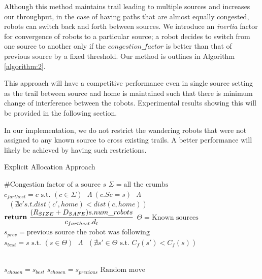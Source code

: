 \documentclass[letterpaper, 10 pt, conference]{ieeeconf}  %
\begin{document}
Although this method maintains trail leading to multiple sources and increases our throughput, in the case of having paths that are almost equally congested, robots can switch back and forth between sources. We introduce an \emph{inertia} factor for convergence of robots to a particular source; a robot decides to switch from one source to another only if the $congestion\_factor$ is better than that of previous source by a fixed threshold. Our method is outlines in Algorithm \ref{algorithm:2}.

This approach will have a competitive performance even in single source setting as the trail between source and home is maintained such that there is minimum change of interference between the robots. Experimental results showing this will be provided in the following section. 

In our implementation, we do not restrict the wandering robots that were not assigned to any known source to cross existing trails. A better performance will likely be achieved by having such restrictions.

\begin{algorithm}
\caption{Explicit Allocation Approach}\label{algorithm:2}
\begin{algorithmic}
\State $\text{\# Congestion factor of a source } s$
  \State $\Sigma = \text{all the crumbs}$
  \State $c_{farthest} =  c \text{ s.t. } (c \in \Sigma) \text{ } \Lambda \ (c.Sc=s) \text{ } \Lambda$
  \State  $\text{                                                 }(\nexists c' { s.t. } dist(c', home) < dist(c, home))$
  \\
  \State $\bold{return} \text{ } \dfrac{(R_{SIZE} + D_{SAFE})  s.num\_robots}{ c_{farthest}.d_t }$
\EndProcedure
\State $\Theta = \text{Known sources}$
\State $s_{prev} = \text{previous source the robot was following}$
\State $s_{best} = s \text{ s.t. } (s \in \Theta) \text{ } \Lambda \text{ } (\nexists s' \in \Theta \text{ s.t. } C_f(s') < C_f(s))$

\\
     \State $s_{chosen} = s_{best}$
  \Else
     \State $s_{chosen} = s_{previous}$
  \EndIf
\Else
   \State $\text{Random move}$
\EndIf

\end{algorithmic}
\end{algorithm}
\end{document}
